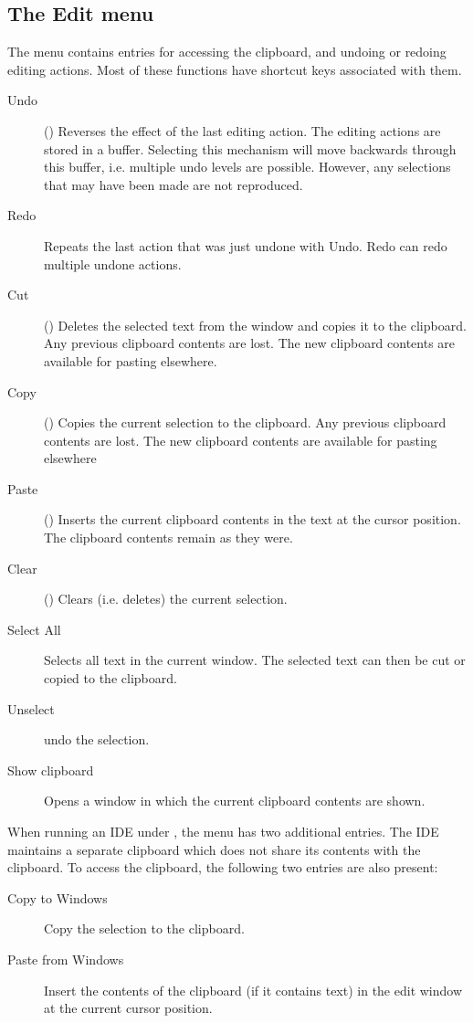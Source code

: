 \subsection{The Edit menu}
\label{se:menuedit}
The  menu contains entries for accessing the clipboard, and
undoing or redoing editing actions. Most of these functions have shortcut
keys associated with them.
\begin{description}
\item[Undo] () Reverses the effect of the last editing action.
The editing actions are stored in a buffer.
Selecting this mechanism will move backwards through this buffer, i.e.
multiple undo levels are possible. 
However, any selections that may have been made are not reproduced.
\item[Redo] Repeats the last action that was just undone with Undo.
Redo can redo multiple undone actions.
\item[Cut] () Deletes the selected text from the window and
copies it to the clipboard. Any previous clipboard contents are lost. 
The new clipboard contents are available for pasting elsewhere.
\item[Copy] () Copies the current selection to the clipboard.
Any previous clipboard contents are lost. The new clipboard
contents are available for pasting elsewhere
\item[Paste] () Inserts the current clipboard contents in the
text at the cursor position. The clipboard contents remain as they were.  
\item[Clear] () Clears (i.e. deletes) the current
selection.
\item[Select All] Selects all text in the current window. The selected
text can then be cut or copied to the clipboard.
\item[Unselect] undo the selection.
\item[Show clipboard] Opens a window in which the current clipboard contents
are shown.
\end{description}
When running an IDE under \windows, the  menu has two
additional entries. The IDE maintains a separate clipboard which does
not share its contents with the \windows clipboard. To access the \windows
clipboard, the following two entries are also present:
\begin{description}
\item[Copy to Windows] Copy the selection to the \windows clipboard.
\item[Paste from Windows] Insert the contents of the \windows clipboard 
(if it contains text) in the edit window at the current cursor position.
\end{description}

